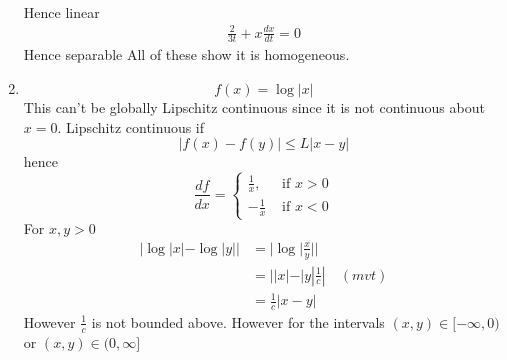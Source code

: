 \documentclass{X:/Documents/Coding/Latex/myassignment}
\begin{document}
\begin{enumerate}
\begin{align*}
    \end{align*}
    Hence linear
    \begin{align*}
        \frac2{3t} + x\frac{dx}{dt} =0
    \end{align*}
    Hence separable
    All of these show it is homogeneous.
    \item 
    \[f(x) = \log |x|\]
    This can't be globally Lipschitz continuous since it is not continuous about $x=0$. 
    Lipschitz continuous if
    \[|f(x) - f(y)| \leq L |x-y|\]
    hence
    \[\frac{df}{dx} = \begin{cases}
        \frac1x, &\text{ if }x > 0\\
        -\frac1x & \text{ if } x<0
    \end{cases}\]
    For $x,y > 0$
    \begin{align*}
        |\log|x| - \log|y|| &= |\log|\frac{x}{y}||\\
        &=||x|-|y|\frac1c| \quad (mvt)\\
        &= \frac1c |x-y|
    \end{align*}
    However $\frac1c$ is not bounded above. However for the intervals $(x,y) \in [-\infty,0)$ or $(x,y) \in (0,\infty]$

\end{enumerate}
\end{document}
